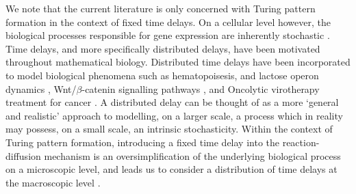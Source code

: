 We note that the current literature is only concerned with Turing pattern formation in the context of fixed time delays. On a cellular level however, the biological processes responsible for gene expression are inherently stochastic \cite{raj,elowitz,mcadams,paulsson}. Time delays, and more specifically distributed delays, have been motivated throughout mathematical biology. Distributed time delays have been incorporated to model biological phenomena such as hematopoisesis, and lactose operon dynamics \cite{newdist}, Wnt/$\beta$-catenin signalling pathways \cite{signal}, and Oncolytic virotherapy treatment for cancer \cite{cancer}. A distributed delay can be thought of as a more `general and realistic' \cite{cancer} approach to modelling, on a larger scale, a process which in reality may possess, on a small scale, an intrinsic stochasticity. Within the context of Turing pattern formation, introducing a fixed time delay into the reaction-diffusion mechanism is an oversimplification of the underlying biological process on a microscopic level, and leads us to consider a distribution of time delays at the macroscopic level \cite{bratsun,krausenew}.

